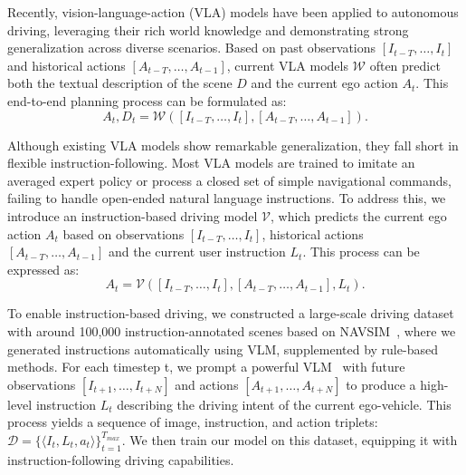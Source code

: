 Recently, vision-language-action (VLA) models have been applied to autonomous driving, leveraging their rich world knowledge and demonstrating strong generalization across diverse scenarios.
Based on past observations $[I_{t-T}, \dots, I_{t}]$ and historical actions $[A_{t-T}, \dots, A_{t-1}]$, current VLA models $\mathcal{W}$ often predict both the textual description of the scene $D$ and the current ego action $A_t$. This end-to-end planning process can be formulated as:
\begin{equation}
    A_t, D_t = \mathcal{W}([I_{t-T}, \dots, I_{t}], [A_{t-T}, \dots, A_{t-1}]).
\end{equation}

Although existing VLA models show remarkable generalization, they fall short in flexible instruction-following. 
Most VLA models are trained to imitate an averaged expert policy or process a closed set of simple navigational commands, failing to handle open-ended natural language instructions.
To address this, we introduce an instruction-based driving model $\mathcal{V}$, which predicts the current ego action $A_t$ based on observations $[I_{t-T}, \dots, I_{t}]$, historical actions $[A_{t-T}, \dots, A_{t-1}]$ and the current user instruction $L_t$. This process can be expressed as:
\begin{equation}
    A_t = \mathcal{V}([I_{t-T}, \dots, I_{t}], [A_{t-T}, \dots, A_{t-1}], L_t).
\end{equation}

To enable instruction-based driving, we constructed a large-scale driving dataset with around 100,000 instruction-annotated scenes based on NAVSIM~\cite{navsim-v1}, where we generated instructions automatically using VLM, supplemented by rule-based methods. 
For each timestep t, we prompt a powerful VLM~\cite{qwen2_5} with future observations $[I_{t+1},\dots, I_{t+N}]$ and actions $[A_{t+1},\dots, A_{t+N}]$ to produce a high-level instruction $L_t$ describing the driving intent of the current ego-vehicle.
This process yields a sequence of image, instruction, and action triplets: $\mathcal{D} = \{\langle I_t, L_t, a_t \rangle\}_{t=1}^{T_{max}}$.
We then train our model on this dataset, equipping it with instruction-following driving capabilities.


